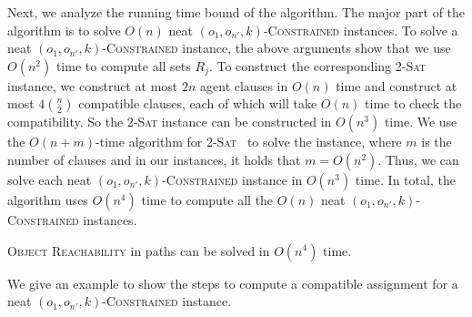 Next, we analyze the running time bound of the algorithm.
The major part of the algorithm is to solve $O(n)$ neat $(o_1,o_{n'},k)$-\textsc{Constrained} instances.
To solve a neat $(o_1,o_{n'},k)$-\textsc{Constrained} instance, the above arguments show that we use $O(n^2)$ time to compute all sets $R_j$.
To construct the corresponding \textsc{2-Sat} instance, we construct at most $2n$ agent clauses in $O(n)$ time and construct at most $4{n \choose 2}$ compatible clauses, each of which will take $O(n)$ time to check the compatibility. So the \textsc{2-Sat} instance can be constructed in $O(n^3)$ time.
We use the $O(n+m)$-time algorithm for \textsc{2-Sat}~\citep{aspvall1982linear} to solve the instance, where $m$ is the number of clauses and in our instances, it holds that $m=O(n^2)$.
Thus, we can solve each neat $(o_1,o_{n'},k)$-\textsc{Constrained} instance in $O(n^3)$ time.
In total, the algorithm uses $O(n^4)$ time to compute all the $O(n)$ neat $(o_1,o_{n'},k)$-\textsc{Constrained} instances.

%

\begin{theorem}
  \label{the_sor}
\textsc{Object Reachability} in paths can be solved in $O(n^4)$ time.
\end{theorem}

We give an example to show the steps to compute a compatible assignment for a neat $(o_1,o_{n'},k)$-\textsc{Constrained} instance.

